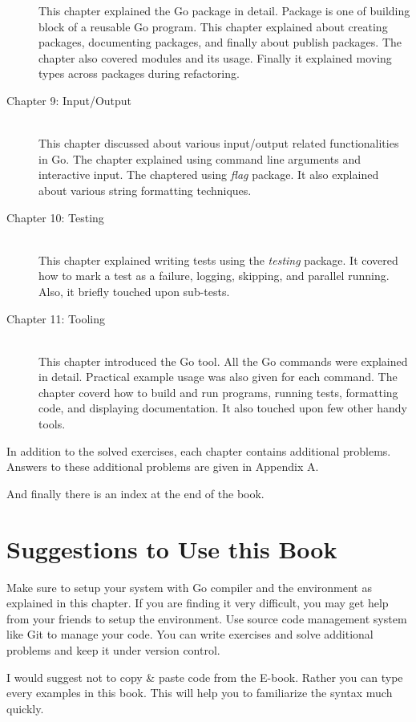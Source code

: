 \begin{description}
This chapter explained the Go package in detail. Package is one of building
block of a reusable Go program. This chapter explained about creating packages,
documenting packages, and finally about publish packages. The chapter also
covered modules and its usage. Finally it explained moving types across packages
during refactoring.
\item[Chapter 9: Input/Output] \hfill \\
This chapter discussed about various input/output related functionalities in Go.
The chapter explained using command line arguments and interactive input. The
chaptered using \textit{flag} package. It also explained about various string
formatting techniques.
\item[Chapter 10: Testing] \hfill \\
This chapter explained writing tests using the \textit{testing} package. It
covered how to mark a test as a failure, logging, skipping, and parallel
running. Also, it briefly touched upon sub-tests.
\item[Chapter 11: Tooling] \hfill \\
This chapter introduced the Go tool. All the Go commands were explained in
detail. Practical example usage was also given for each command. The chapter
coverd how to build and run programs, running tests, formatting code, and
displaying documentation. It also touched upon few other handy tools.
\end{description}

In addition to the solved exercises, each chapter contains additional problems.
Answers to these additional problems are given in Appendix A.

And finally there is an index at the end of the book.

\section{Suggestions to Use this Book}

Make sure to setup your system with Go compiler and the environment as explained
in this chapter. If you are finding it very difficult, you may get help from
your friends to setup the environment. Use source code management system like
Git to manage your code. You can write exercises and solve additional problems
and keep it under version control.

I would suggest not to copy \& paste code from the E-book. Rather you can type
every examples in this book. This will help you to familiarize the syntax much
quickly.

